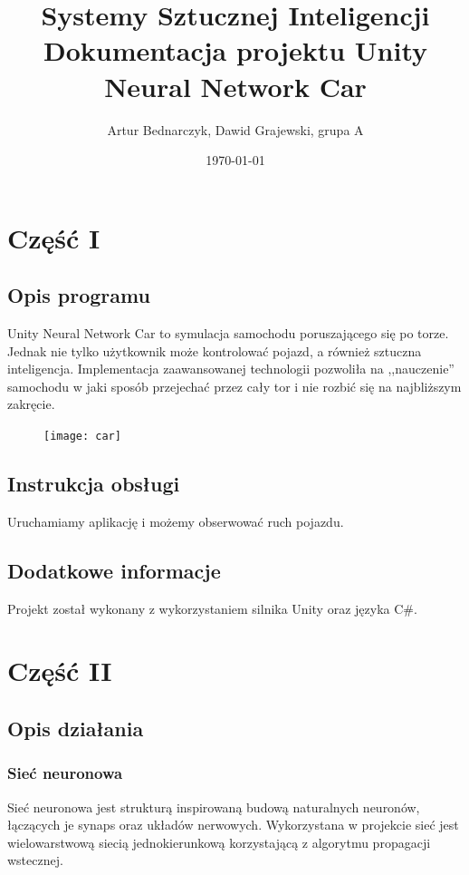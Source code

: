 \documentclass[12pt,a4paper]{article}
\begin{document}
	
	\title{Systemy Sztucznej Inteligencji\\\small{Dokumentacja projektu Unity Neural Network Car}}
	\author{Artur Bednarczyk, Dawid Grajewski, grupa A}
	\date{\today}

	\maketitle
	\newpage
	\tableofcontents
	\newpage
	\section{Część I}
	\subsection{Opis programu}
	Unity Neural Network Car to symulacja samochodu poruszającego się po torze. Jednak nie tylko użytkownik może kontrolować pojazd, a również sztuczna inteligencja. Implementacja zaawansowanej technologii pozwoliła na ,,nauczenie'' samochodu w jaki sposób przejechać przez cały tor i nie rozbić się na najbliższym zakręcie.
	\begin{figure}[H]
	\texttt{[image: car]}
	\centering
	\end{figure}
	\subsection{Instrukcja obsługi}
	Uruchamiamy aplikację i możemy obserwować ruch pojazdu.
	\subsection{Dodatkowe informacje}
	Projekt został wykonany z wykorzystaniem silnika Unity oraz języka C\#.
	\newpage
	\section{Część II}
	\subsection{Opis działania} 
\subsubsection{Sieć neuronowa}
Sieć neuronowa jest strukturą inspirowaną budową naturalnych neuronów, łączących je synaps oraz układów nerwowych. Wykorzystana w projekcie sieć jest wielowarstwową siecią jednokierunkową korzystającą z algorytmu propagacji wstecznej.
\end{document}
